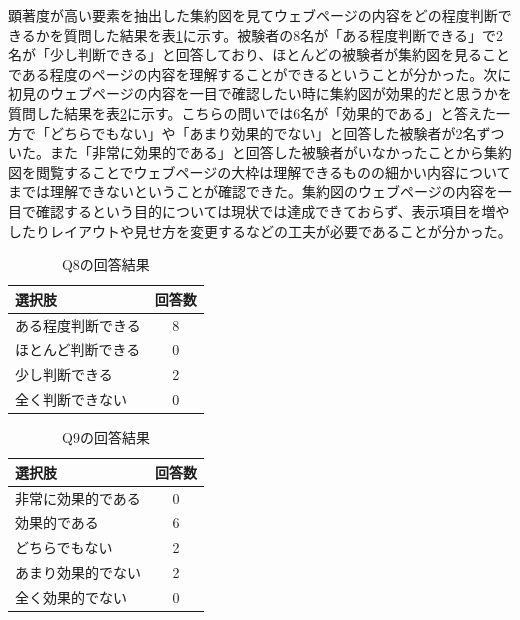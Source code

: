 \par 顕著度が高い要素を抽出した集約図を見てウェブページの内容をどの程度判断できるかを質問した結果を表\ref{table:evaluation03-1}に示す。被験者の8名が「ある程度判断できる」で2名が「少し判断できる」と回答しており、ほとんどの被験者が集約図を見ることである程度のページの内容を理解することができるということが分かった。次に初見のウェブページの内容を一目で確認したい時に集約図が効果的だと思うかを質問した結果を表\ref{table:evaluation03-2}に示す。こちらの問いでは6名が「効果的である」と答えた一方で「どちらでもない」や「あまり効果的でない」と回答した被験者が2名ずついた。また「非常に効果的である」と回答した被験者がいなかったことから集約図を閲覧することでウェブページの大枠は理解できるものの細かい内容についてまでは理解できないということが確認できた。集約図のウェブページの内容を一目で確認するという目的については現状では達成できておらず、表示項目を増やしたりレイアウトや見せ方を変更するなどの工夫が必要であることが分かった。

\begin{table}[H]
    \caption{Q8の回答結果}
    \label{table:evaluation03-1}
    \centering
    \begin{tabular}{lc}
      \hline
      選択肢 & 回答数 \\
      \hline \hline
      ある程度判断できる & 8 \\
      ほとんど判断できる & 0 \\
      少し判断できる & 2 \\
      全く判断できない & 0 \\
      \hline
    \end{tabular}
\end{table}

\begin{table}[H]
    \caption{Q9の回答結果}
    \label{table:evaluation03-2}
    \centering
    \begin{tabular}{lc}
      \hline
      選択肢 & 回答数 \\
      \hline \hline
      非常に効果的である & 0 \\
      効果的である & 6 \\
      どちらでもない & 2 \\
      あまり効果的でない & 2 \\
      全く効果的でない & 0 \\
      \hline
    \end{tabular}
\end{table}
